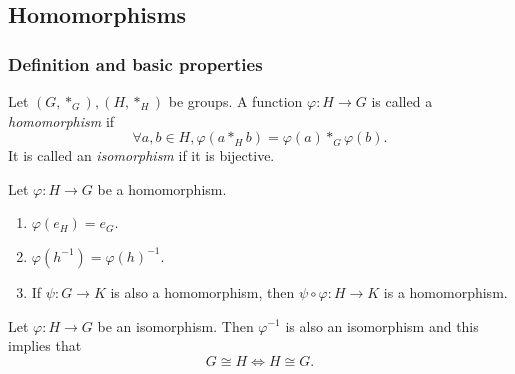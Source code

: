 \documentclass[a4paper]{article}
\begin{document}
    \subsection{Homomorphisms}
    \subsubsection{Definition and basic properties}
    \begin{definition}
        Let $ (G,*_G), (H,*_H) $ be groups. A function $ \varphi: H \to G $ is called a \textit{homomorphism} if
        \[
            \forall a,b\in H, \varphi (a*_Hb)=\varphi (a)*_G \varphi (b)
        .\]
        It is called an \textit{isomorphism} if it is bijective.
    \end{definition}
    \begin{proposition}\label{prop:homom}
        Let $ \varphi :H\to G $ be a homomorphism.
        \begin{enumerate}[(1)]
            \item $ \varphi (e_H)=e_G $.
            \item $ \varphi (h^{-1})=\varphi (h)^{-1} $.
            \item If $ \psi:G\to K $ is also a homomorphism, then $ \psi\circ \varphi :H\to K $ is a homomorphism.
        \end{enumerate}
    \end{proposition}
    \begin{proposition}\label{prop:isom_inverse_is_also_an_isom}
        Let $ \varphi :H\to G $ be an isomorphism. Then $ \varphi^{-1} $ is also an isomorphism and this implies that 
        \[
            G \cong H \Longleftrightarrow H \cong G
        .\]
    \end{proposition}
\end{document}
